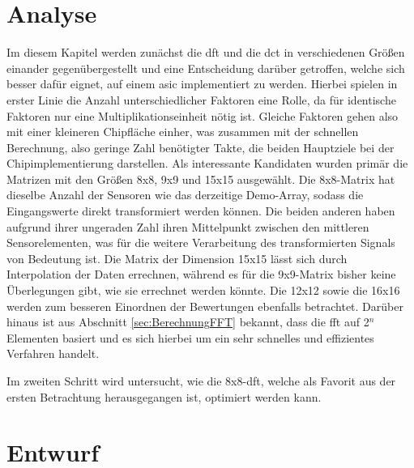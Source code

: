 \chapter{Analyse}
Im diesem Kapitel werden zunächst die \gls{dft} und die \gls{dct} in verschiedenen Größen einander gegenübergestellt und eine Entscheidung darüber getroffen, welche
sich besser dafür eignet, auf einem \gls{asic} implementiert zu werden. Hierbei spielen in erster Linie die Anzahl unterschiedlicher Faktoren eine Rolle, 
da für identische Faktoren nur eine Multiplikationseinheit nötig ist. Gleiche Faktoren gehen also mit einer kleineren Chipfläche einher, was zusammen mit der schnellen 
Berechnung, also geringe Zahl benötigter Takte, die beiden Hauptziele bei der Chipimplementierung darstellen.
Als interessante Kandidaten wurden primär die Matrizen mit den Größen 8x8, 9x9 und 15x15 ausgewählt. 
Die 8x8-Matrix hat dieselbe Anzahl der Sensoren wie das derzeitige Demo-Array, sodass die Eingangswerte
direkt transformiert werden können. 
Die beiden anderen haben aufgrund ihrer ungeraden Zahl ihren Mittelpunkt zwischen den mittleren Sensorelementen, was für die 
weitere Verarbeitung des transformierten Signals von Bedeutung ist. Die Matrix der Dimension 15x15 lässt sich durch Interpolation der Daten errechnen, während es für
die 9x9-Matrix bisher keine Überlegungen gibt, wie sie errechnet werden könnte.
Die 12x12 sowie die 16x16 werden zum besseren Einordnen der Bewertungen ebenfalls betrachtet.
Darüber hinaus ist aus Abschnitt \ref{sec:BerechnungFFT} bekannt, dass die \gls{fft} auf 2$^n$ Elementen basiert und es sich hierbei um ein sehr schnelles und 
effizientes Verfahren handelt. 

Im zweiten Schritt wird untersucht, wie die 8x8-\gls{dft}, welche als Favorit aus der ersten Betrachtung herausgegangen ist, optimiert werden kann.


 
 
 
 

 
 
 
\chapter{Entwurf}

 

 
 
 
 
  
 
